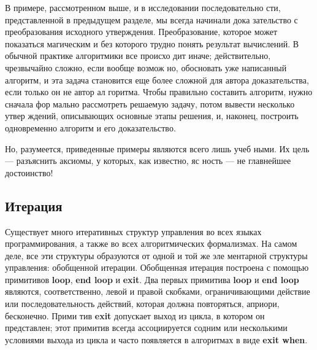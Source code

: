 \parindent=1cm В примере, рассмотренном выше, и в исследовании последовательно­
сти,  представленной в предыдущем  разделе,  мы  всегда начинали  дока­
зательство с преобразования исходного утверждения. Преобразование, 
которое может показаться  магическим  и  без  которого трудно  понять 
результат вычислений. В обычной практике алгоритмики все происхо­
дит  иначе;  действительно,  чрезвычайно  сложно,  если  вообще  возмож­
но, обосновать уже написанный алгоритм, и эта задача становится еще 
более сложной для  автора доказательства, если только он не автор ал­
горитма.  Чтобы  правильно составить  алгоритм,  нужно  сначала фор­
мально рассмотреть решаемую задачу, потом вывести несколько утвер­
ждений, описывающих основные этапы решения, и, наконец, построить 
одновременно алгоритм и его доказательство.
\pagebreak

Но,  разумеется,  приведенные  примеры  являются  всего  лишь  учеб­
ными.  Их  цель  —  разъяснить  аксиомы,  у  которых,  как  известно,  яс­
ность — не  главнейшее  достоинство!
\subsection{Итерация}
\noindent Существует много итеративных структур управления во всех языках 
программирования, а также во всех алгоритмических формализмах. 
На самом деле, все эти структуры образуются от одной и той же эле­
ментарной структуры управления: обобщенной итерации. Обобщенная 
итерация построена с помощью примитивов \textbf{loop},  \textbf{end loop} и \textbf{exit}. Два 
первых примитива \textbf{loop} и \textbf{end loop}  являются, соответственно, левой и 
правой скобками, ограничивающими действие или последовательность 
действий, которая должна повторяться, априори, бесконечно. Прими­
тив \textbf{exit} допускает выход из цикла, в котором он представлен; этот 
примитив  всегда  ассоциируется содним  или  несколькими  условиями 
выхода из цикла и часто появляется в алгоритмах в виде \textbf{exit when}.

